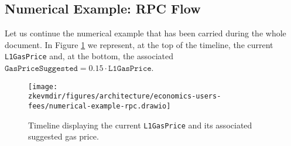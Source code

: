 \subsection{Numerical Example: RPC Flow} \label{sec:numerical-example-rpc}

Let us continue the numerical example that has been carried during the whole document. In Figure \ref{fig:numerical-example-rpc} we represent, at the top of the timeline, the current \texttt{L1GasPrice} and, at the bottom, the associated $\texttt{GasPriceSuggested} = 0.15 \cdot \texttt{L1GasPrice}$.

\begin{figure}[H]
\centering
\texttt{[image: \\zkevmdir/figures/architecture/economics-users-fees/numerical-example-rpc.drawio]}
\caption{Timeline displaying the current \texttt{L1GasPrice} and its associated suggested gas price. }
\label{fig:numerical-example-rpc}
\end{figure}

